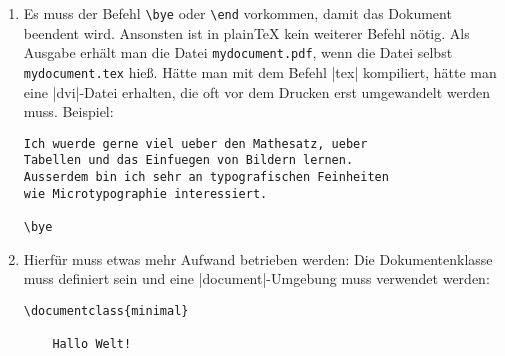 % 


\begin{enumerate}[label=\alph*), start=2]
	\item Es muss der Befehl \texttt{\textbackslash bye} oder \texttt{\textbackslash end} vorkommen, damit das Dokument beendent wird. Ansonsten ist in plainTeX kein weiterer Befehl nötig. Als Ausgabe erhält man die Datei \verb|mydocument.pdf|, wenn die Datei selbst \verb|mydocument.tex| hieß. Hätte man mit dem Befehl |tex| kompiliert, hätte man eine |dvi|-Datei erhalten, die oft vor dem Drucken erst umgewandelt werden muss. Beispiel:

\begin{lstlisting}
Ich wuerde gerne viel ueber den Mathesatz, ueber
Tabellen und das Einfuegen von Bildern lernen.
Ausserdem bin ich sehr an typografischen Feinheiten
wie Microtypographie interessiert.

\bye
\end{lstlisting}

		\item Hierfür muss etwas mehr Aufwand betrieben werden: Die Dokumentenklasse muss definiert sein und eine |document|-Umgebung muss verwendet werden:
		
\begin{lstlisting}
\documentclass{minimal}

	Hallo Welt!

\end{lstlisting}

\end{enumerate}


